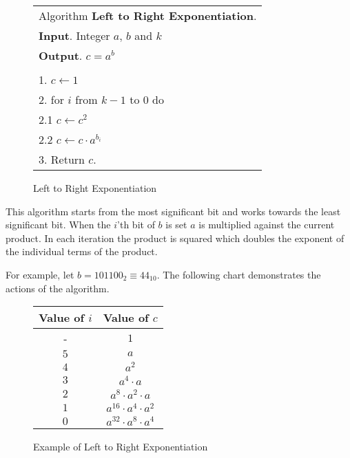 \documentclass[b5paper]{book}
\begin{document}
\begin{figure}[!here]
\begin{small}
\begin{center}
\begin{tabular}{l}
\hline Algorithm \textbf{Left to Right Exponentiation}. \\
\textbf{Input}.   Integer $a$, $b$ and $k$ \\
\textbf{Output}.  $c = a^b$ \\
\hline \\
1.  $c \leftarrow 1$ \\
2.  for $i$ from $k - 1$ to $0$ do \\
\hspace{3mm}2.1  $c \leftarrow c^2$ \\
\hspace{3mm}2.2  $c \leftarrow c \cdot a^{b_i}$ \\
3.  Return $c$. \\
\hline
\end{tabular}
\end{center}
\end{small}
\caption{Left to Right Exponentiation}
\label{fig:LTOR}
\end{figure}

This algorithm starts from the most significant bit and works towards the least significant bit.  When the $i$'th bit of $b$ is set $a$ is
multiplied against the current product.  In each iteration the product is squared which doubles the exponent of the individual terms of the
product.  

For example, let $b = 101100_2 \equiv 44_{10}$.  The following chart demonstrates the actions of the algorithm.

\newpage\begin{figure}
\begin{center}
\begin{tabular}{|c|c|}
\hline \textbf{Value of $i$} & \textbf{Value of $c$} \\
\hline - & $1$ \\
\hline $5$ & $a$ \\
\hline $4$ & $a^2$ \\
\hline $3$ & $a^4 \cdot a$ \\
\hline $2$ & $a^8 \cdot a^2 \cdot a$ \\
\hline $1$ & $a^{16} \cdot a^4 \cdot a^2$ \\
\hline $0$ & $a^{32} \cdot a^8 \cdot a^4$ \\
\hline
\end{tabular}
\end{center}
\caption{Example of Left to Right Exponentiation}
\end{figure}
\end{document}
